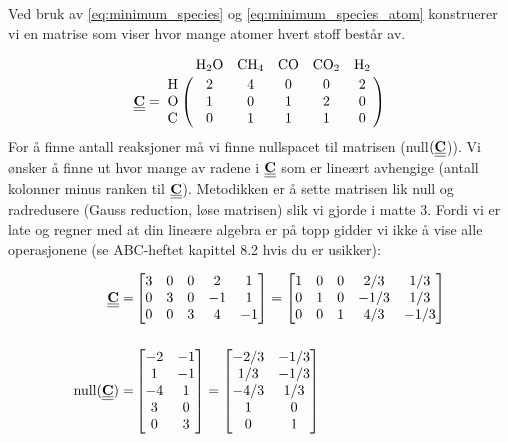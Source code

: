 Ved bruk av \cref{eq:minimum_species} og \cref{eq:minimum_species_atom} konstruerer vi en matrise som viser hvor mange atomer hvert stoff består av.

\begin{equation}
    \mymat{C} = 
    \bordermatrix{~ & \ce{H2O} & \ce{CH4} & \ce{CO} &\ce{CO2} & \ce{H2}  \cr
                  \ce{H} & 2 & 4 & 0 & 0 & 2\cr
                  \ce{O} & 1 & 0 & 1 & 2 & 0\cr
                  \ce{C} & 0 & 1 & 1 & 1 & 0\cr
                  }
\end{equation}
For å finne antall reaksjoner må vi finne nullspacet til matrisen (null$(\underline{\underline{\textbf{C}}}$)). Vi ønsker å finne ut hvor mange av radene i $\underline{\underline{\textbf{C}}}$ som er lineært avhengige (antall kolonner minus ranken til $\underline{\underline{\textbf{C}}}$). Metodikken er å sette matrisen lik null og radredusere (Gauss reduction, løse matrisen) slik vi gjorde i matte 3. Fordi vi er late og regner med at din lineære algebra er på topp gidder vi ikke å vise alle operasjonene (se ABC-heftet kapittel 8.2 hvis du er usikker):

\begin{align}
    \underline{\underline{\textbf{C}}} =& 
    \begin{bmatrix}
        3 & 0 & 0 & 2 & 1 \\
        0 & 3 & 0 & -1 & 1 \\
        0 & 0 & 3 & 4 & -1
    \end{bmatrix}
    =
    \begin{bmatrix}
        1 & 0 & 0 & 2/3 & 1/3 \\
        0 & 1 & 0 & -1/3 & 1/3 \\
        0 & 0 & 1 & 4/3 & -1/3
    \end{bmatrix}
    \\[0.5cm]
    \text{null}(\underline{\underline{\textbf{C}}}) =& 
    \begin{bmatrix}
        -2 & -1 \\
        1 & -1 \\
        -4 & 1 \\
        3  & 0 \\
        0 & 3
    \end{bmatrix}
     =
     \begin{bmatrix}
        -2/3 & -1/3 \\
        1/3 & -1/3 \\
        -4/3 & 1/3 \\
        1  & 0 \\
        0 & 1
    \end{bmatrix}
\end{align}


